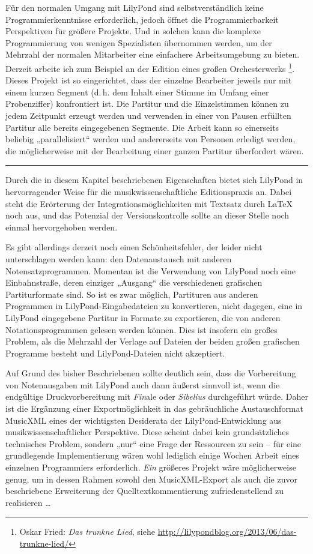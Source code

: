 \documentclass[DIV=12]{scrreprt}
\begin{document}
Für den normalen Umgang mit LilyPond sind selbstverständlich keine Programmierkenntnisse erforderlich, jedoch öffnet die Programmierbarkeit Perspektiven für größere Projekte.
Und in solchen kann die komplexe Programmierung von wenigen Spezialisten übernommen werden, um der Mehrzahl der normalen Mitarbeiter eine einfachere Arbeitsumgebung zu bieten.
Derzeit arbeite ich zum Beispiel an der Edition eines großen Orchesterwerks%
\footnote{Oskar Fried: \emph{Das trunkne Lied}, siehe \url{http://lilypondblog.org/2013/06/das-trunkne-lied/}}.
Dieses Projekt ist so eingerichtet, dass der einzelne Bearbeiter jeweils nur mit einem kurzen Segment (d.\,h. dem Inhalt einer Stimme im Umfang einer Probenziffer) konfrontiert ist.
Die Partitur und die Einzelstimmen können zu jedem Zeitpunkt erzeugt werden und verwenden in einer von Pausen erfüllten Partitur alle bereits eingegebenen Segmente.
Die Arbeit kann so einerseits beliebig „parallelisiert“ werden und andererseits von Personen erledigt werden, die möglicherweise mit der Bearbeitung einer ganzen Partitur überfordert wären.

\bigskip
\hrule
\bigskip

Durch die in diesem Kapitel beschriebenen Eigenschaften bietet sich LilyPond in hervorragender Weise für die musikwissenschaftliche Editionspraxis an.
Dabei steht die Erörterung der Integrationsmöglichkeiten mit Textsatz durch \LaTeX{} noch aus, und das Potenzial der Versionskontrolle sollte an dieser Stelle noch einmal hervorgehoben werden.

Es gibt allerdings derzeit noch einen Schönheitsfehler, der leider nicht unterschlagen werden kann: den Datenaustausch mit anderen Notensatzprogrammen.
Momentan ist die Verwendung von LilyPond noch eine Einbahnstraße, deren einziger „Ausgang“ die verschiedenen grafischen Partiturformate sind.
So ist es zwar möglich, Partituren aus anderen Programmen in LilyPond-Eingabedateien zu konvertieren, nicht dagegen, eine in LilyPond eingegebene Partitur in Formate zu exportieren, die von anderen Notationsprogrammen gelesen werden können.
Dies ist insofern ein großes Problem, als die Mehrzahl der Verlage auf Dateien der beiden großen grafischen Programme besteht und LilyPond-Dateien nicht akzeptiert.

Auf Grund des bisher Beschriebenen sollte deutlich sein, dass die Vorbereitung von Notenausgaben mit LilyPond auch dann äußerst sinnvoll ist, wenn die endgültige Druckvorbereitung mit \emph{Fin}ale oder \emph{Sibelius} durchgeführt würde.
Daher ist die Ergänzung einer Exportmöglichkeit in das gebräuchliche Austauschformat MusicXML eines der wichtigsten Desiderata der LilyPond-Entwicklung aus musikwissenschaftlicher Perspektive.
Diese scheint dabei kein grundsätzliches technisches Problem, sondern „nur“ eine Frage der Ressourcen zu sein -- für eine grundlegende Implementierung wären wohl lediglich einige Wochen Arbeit eines einzelnen Programmiers erforderlich.
\emph{Ein} größeres Projekt wäre möglicherweise genug, um in dessen Rahmen sowohl den MusicXML-Export als auch die zuvor beschriebene Erweiterung der Quelltextkommentierung zufriedenstellend zu realisieren \dots
\end{document}
